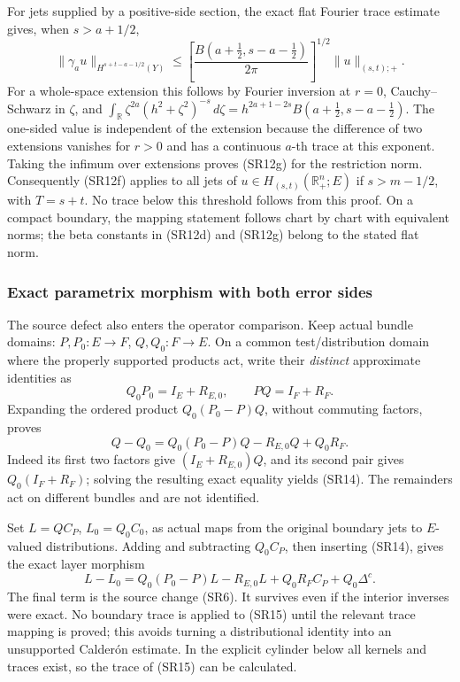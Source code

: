 \documentclass[
  11pt,
]{article}
\begin{document}
For jets supplied by a positive-side section, the exact flat Fourier
trace estimate gives, when \(s>a+1/2\), \[
\|\gamma_a u\|_{H^{s+t-a-1/2}(Y)}
\leq
\left[\frac{B(a+\tfrac12,s-a-\tfrac12)}{2\pi}\right]^{1/2}
\|u\|_{(s,t);+}.
\tag{SR12g}
\] For a whole-space extension this follows by Fourier inversion at
\(r=0\), Cauchy--Schwarz in \(\zeta\), and
\(\int_{\mathbb R}\zeta^{2a}(h^2+\zeta^2)^{-s}\,d\zeta
=h^{2a+1-2s}B(a+\tfrac12,s-a-\tfrac12)\). The one-sided value is
independent of the extension because the difference of two extensions
vanishes for \(r>0\) and has a continuous \(a\)-th trace at this
exponent. Taking the infimum over extensions proves (SR12g) for the
restriction norm. Consequently (SR12f) applies to all jets of
\(u\in H_{(s,t)}(\mathbb R_+^n;E)\) if \(s>m-1/2\), with \(T=s+t\). No
trace below this threshold follows from this proof. On a compact
boundary, the mapping statement follows chart by chart with equivalent
norms; the beta constants in (SR12d) and (SR12g) belong to the stated
flat norm.

\subsubsection{Exact parametrix morphism with both error
sides}\label{exact-parametrix-morphism-with-both-error-sides}

The source defect also enters the operator comparison. Keep actual
bundle domains: \(P,P_0:E\to F\), \(Q,Q_0:F\to E\). On a common
test/distribution domain where the properly supported products act,
write their \emph{distinct} approximate identities as \[
Q_0P_0=I_E+R_{E,0},\qquad
PQ=I_F+R_F.
\tag{SR13}
\] Expanding the ordered product \(Q_0(P_0-P)Q\), without commuting
factors, proves \[
\boxed{\displaystyle
Q-Q_0=Q_0(P_0-P)Q-R_{E,0}Q+Q_0R_F.}
\tag{SR14}
\] Indeed its first two factors give \((I_E+R_{E,0})Q\), and its second
pair gives \(Q_0(I_F+R_F)\); solving the resulting exact equality yields
(SR14). The remainders act on different bundles and are not identified.

Set \(L=QC_P\), \(L_0=Q_0C_0\), as actual maps from the original
boundary jets to \(E\)-valued distributions. Adding and subtracting
\(Q_0C_P\), then inserting (SR14), gives the exact layer morphism \[
\boxed{\displaystyle
L-L_0
=Q_0(P_0-P)L-R_{E,0}L+Q_0R_FC_P+Q_0\Delta^c.}
\tag{SR15}
\] The final term is the source change (SR6). It survives even if the
interior inverses were exact. No boundary trace is applied to (SR15)
until the relevant trace mapping is proved; this avoids turning a
distributional identity into an unsupported Calderón estimate. In the
explicit cylinder below all kernels and traces exist, so the trace of
(SR15) can be calculated.
\end{document}
